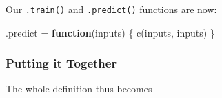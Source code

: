 \documentclass[
]{scrbook}
\newenvironment{Shaded}{\begin{snugshade}}{\end{snugshade}}
\newcommand{\ControlFlowTok}[1]{\textcolor[rgb]{0.13,0.29,0.53}{\textbf{#1}}}
\newcommand{\FunctionTok}[1]{\textcolor[rgb]{0.00,0.00,0.00}{#1}}
\newcommand{\NormalTok}[1]{#1}
\newcommand{\OtherTok}[1]{\textcolor[rgb]{0.56,0.35,0.01}{#1}}
\newcommand{\SpecialCharTok}[1]{\textcolor[rgb]{0.00,0.00,0.00}{#1}}
\renewenvironment{Shaded} {\begin{snugshade}\small} {\end{snugshade}}
\begin{document}
Our \texttt{.train()} and \texttt{.predict()} functions are now:

\begin{Shaded}
\end{Shaded}

\begin{Shaded}
\begin{Highlighting}[]
\NormalTok{.predict }\OtherTok{=} \ControlFlowTok{function}\NormalTok{(inputs) \{}
  \FunctionTok{c}\NormalTok{(inputs, inputs)}
\NormalTok{\}}
\end{Highlighting}
\end{Shaded}

\hypertarget{putting-it-together}{%
\subsubsection{Putting it Together}\label{putting-it-together}}

The whole definition thus becomes
\end{document}
